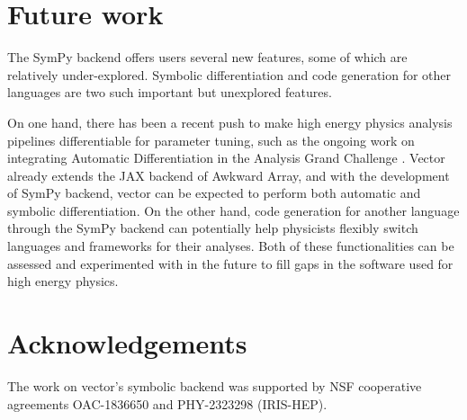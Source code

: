 \documentclass{webofc}
\begin{document}
\section{Future work}
\label{sec-future-work}

The SymPy backend offers users several new features, some of which are relatively under-explored. Symbolic differentiation and code generation for other languages are two such important but unexplored features.

On one hand, there has been a recent push to make high energy physics analysis pipelines differentiable for parameter tuning, such as the ongoing work on integrating Automatic Differentiation in the Analysis Grand Challenge \cite{Held:2022sfw}. Vector already extends the JAX \cite{Bradbury:2018} backend of Awkward Array, and with the development of SymPy backend, vector can be expected to perform both automatic and symbolic differentiation. On the other hand, code generation for another language through the SymPy backend can potentially help physicists flexibly switch languages and frameworks for their analyses. Both of these functionalities can be assessed and experimented with in the future to fill gaps in the software used for high energy physics.

\section{Acknowledgements}
\label{sec-acknowledgements}

The work on vector's symbolic backend was supported by NSF cooperative agreements OAC-1836650 and PHY-2323298 (IRIS-HEP).


\end{document}
